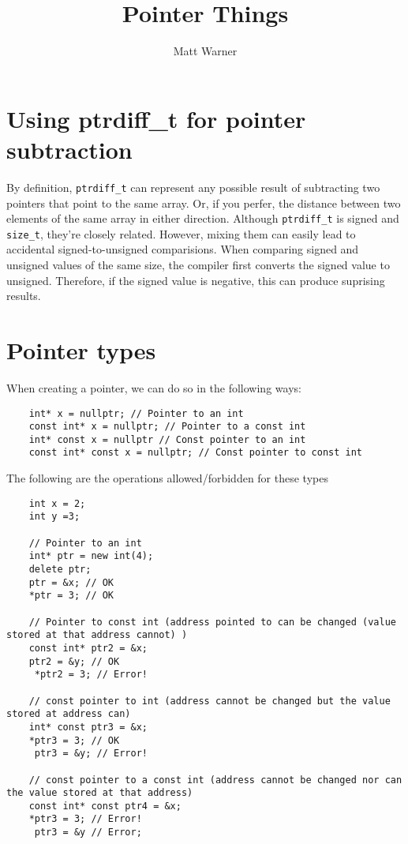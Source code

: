 \documentclass{report}
\title{\Huge{Pointer Things}}
\author{\huge{Matt Warner}}
\date{\huge{}}
\begin{document}
    \maketitle
    \section{Using ptrdiff\_t for pointer subtraction}
    By definition, \texttt{ptrdiff\_t} can represent any possible result of subtracting two pointers that point to the same array.  Or, if you perfer, the distance between two elements of the same array in either direction.
    \noindent Although \texttt{ptrdiff\_t} is signed and \texttt{size\_t}, they're closely related. However, mixing them can easily lead to accidental signed-to-unsigned comparisions.
    \bigbreak \noindent
    When comparing signed and unsigned values of the same size, the compiler first converts the signed value to unsigned. Therefore, if the signed value is negative, this can produce suprising results.
    \section{Pointer types}
    When creating a pointer, we can do so in the following ways:
    \begin{verbatim}
    int* x = nullptr; // Pointer to an int
    const int* x = nullptr; // Pointer to a const int
    int* const x = nullptr // Const pointer to an int
    const int* const x = nullptr; // Const pointer to const int
    \end{verbatim}
    The following are the operations allowed/forbidden for these types
    \begin{verbatim}
    int x = 2;
    int y =3;
                                   
    // Pointer to an int 
    int* ptr = new int(4);
    delete ptr;
    ptr = &x; // OK
    *ptr = 3; // OK
              
    // Pointer to const int (address pointed to can be changed (value stored at that address cannot) )
    const int* ptr2 = &x;
    ptr2 = &y; // OK
     *ptr2 = 3; // Error!

    // const pointer to int (address cannot be changed but the value stored at address can)
    int* const ptr3 = &x;
    *ptr3 = 3; // OK
     ptr3 = &y; // Error!

    // const pointer to a const int (address cannot be changed nor can the value stored at that address)
    const int* const ptr4 = &x;
    *ptr3 = 3; // Error!
     ptr3 = &y // Error;

    \end{verbatim}
\end{document}
